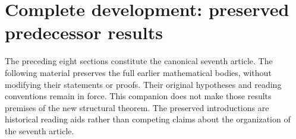 \newif\ifcomplete\completetrue


\clearpage
\section*{Complete development: preserved predecessor results}
The preceding eight sections constitute the canonical seventh article.
The following material preserves the full earlier mathematical bodies,
without modifying their statements or proofs. Their original hypotheses
and reading conventions remain in force. This companion does not make
those results premises of the new structural theorem. The preserved
introductions are historical reading aids rather than competing claims
about the organization of the seventh article.


















